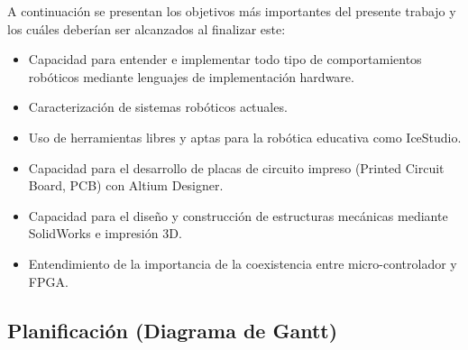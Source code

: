 A continuación se presentan los objetivos más importantes del presente trabajo y los cuáles deberían ser alcanzados al finalizar este:
\begin{itemize}
	\item Capacidad para entender e implementar todo tipo de comportamientos robóticos mediante lenguajes de implementación hardware.
	\item Caracterización de sistemas robóticos actuales.
	\item Uso de herramientas libres y aptas para la robótica educativa como IceStudio.
	\item Capacidad para el desarrollo de placas de circuito impreso (Printed Circuit Board, PCB) con Altium Designer.
	\item Capacidad para el diseño y construcción de estructuras mecánicas mediante SolidWorks e impresión 3D.
	\item Entendimiento de la importancia de la coexistencia entre micro-controlador y FPGA.
\end{itemize}
\subsection{Planificación (Diagrama de Gantt)}

